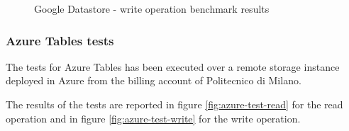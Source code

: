 \begin{figure}[tbh]
  \centering
  \qquad
  \caption{Google Datastore - write operation benchmark results}
  \label{fig:gae-test-write}
\end{figure} 
 
\subsubsection{Azure Tables tests}
The tests for Azure Tables has been executed over a remote storage instance deployed in Azure from the billing account of Politecnico di Milano.

\noindent The results of the tests are reported in figure \ref{fig:azure-test-read} for the read operation and in figure \ref{fig:azure-test-write} for the write operation.
 
